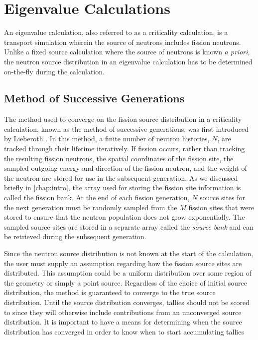 \section{Eigenvalue Calculations}

An eigenvalue calculation, also referred to as a criticality calculation, is a
transport simulation wherein the source of neutrons includes fission
neutrons. Unlike a fixed source calculation where the source of neutrons is
known \emph{a priori}, the neutron source distribution in an eigenvalue
calculation has to be determined on-the-fly during the calculation.

\subsection{Method of Successive Generations}
\label{sec:successive-generations}

The method used to converge on the fission source distribution in a criticality
calculation, known as the method of successive generations, was first introduced
by Lieberoth \cite{nukleonik-lieberoth-1968}. In this method, a finite number of
neutron histories, $N$, are tracked through their lifetime iteratively. If
fission occurs, rather than tracking the resulting fission neutrons, the spatial
coordinates of the fission site, the sampled outgoing energy and direction of
the fission neutron, and the weight of the neutron are stored for use in the
subsequent generation. As we discussed briefly in \autoref{chap:intro}, the
array used for storing the fission site information is called the fission
bank. At the end of each fission generation, $N$ source sites for the next
generation must be randomly sampled from the $M$ fission sites that were stored
to ensure that the neutron population does not grow exponentially. The sampled
source sites are stored in a separate array called the \emph{source bank} and
can be retrieved during the subsequent generation.

Since the neutron source distribution is not known at the start of the
calculation, the user must supply an assumption regarding how the fission source
sites are distributed. This assumption could be a uniform distribution over some
region of the geometry or simply a point source. Regardless of the choice of
initial source distribution, the method is guaranteed to converge to the true
source distribution. Until the source distribution converges, tallies should not
be scored to since they will otherwise include contributions from an unconverged
source distribution. It is important to have a means for determining when the
source distribution has converged in order to know when to start accumulating
tallies

